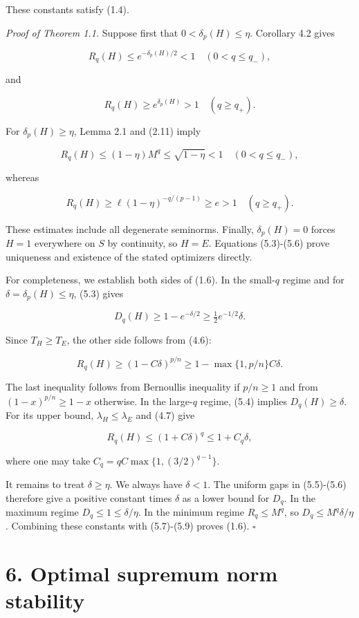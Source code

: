 \documentclass[11pt]{article}
\begin{document}
These constants satisfy (1.4).

\emph{Proof of Theorem 1.1.} Suppose first that
\(0<\delta_p(H)\leq\eta\). Corollary 4.2 gives

\[
R_q(H)\leq e^{-\delta_p(H)/2}<1
\quad(0<q\leq q_-),
\tag{5.3}
\]

and

\[
R_q(H)\geq e^{\delta_p(H)}>1
\quad(q\geq q_+).
\tag{5.4}
\]

For \(\delta_p(H)\geq\eta\), Lemma 2.1 and (2.11) imply

\[
R_q(H)\leq(1-\eta)M^q
\leq\sqrt{1-\eta}<1
\quad(0<q\leq q_-),
\tag{5.5}
\]

whereas

\[
R_q(H)\geq\ell(1-\eta)^{-q/(p-1)}
\geq e>1
\quad(q\geq q_+).
\tag{5.6}
\]

These estimates include all degenerate seminorms. Finally,
\(\delta_p(H)=0\) forces \(H=1\) everywhere on \(S\) by continuity, so
\(H=E\). Equations (5.3)-(5.6) prove uniqueness and existence of the
stated optimizers directly.

For completeness, we establish both sides of (1.6). In the small-\(q\)
regime and for \(\delta=\delta_p(H)\leq\eta\), (5.3) gives

\[
D_q(H)\geq1-e^{-\delta/2}
\geq\tfrac12 e^{-1/2}\delta.
\tag{5.7}
\]

Since \(T_H\geq T_E\), the other side follows from (4.6):

\[
R_q(H)\geq(1-C\delta)^{p/n}
\geq1-\max\{1,p/n\}C\delta.
\tag{5.8}
\]

The last inequality follows from Bernoulli\textquotesingle s inequality
if \(p/n\geq1\) and from \((1-x)^{p/n}\geq1-x\) otherwise. In the
large-\(q\) regime, (5.4) implies \(D_q(H)\geq\delta\). For its upper
bound, \(\lambda_H\leq\lambda_E\) and (4.7) give

\[
R_q(H)\leq(1+C\delta)^q\leq1+C_q\delta,
\tag{5.9}
\]

where one may take \(C_q=qC\max\{1,(3/2)^{q-1}\}\).

It remains to treat \(\delta\geq\eta\). We always have \(\delta<1\). The
uniform gaps in (5.5)-(5.6) therefore give a positive constant times
\(\delta\) as a lower bound for \(D_q\). In the maximum regime
\(D_q\leq1\leq\delta/\eta\). In the minimum regime \(R_q\leq M^q\), so
\(D_q\leq M^q\delta/\eta\). Combining these constants with (5.7)-(5.9)
proves (1.6). \(\square\)

\section{6. Optimal supremum norm
stability}\label{optimal-supremum-norm-stability}
\end{document}
